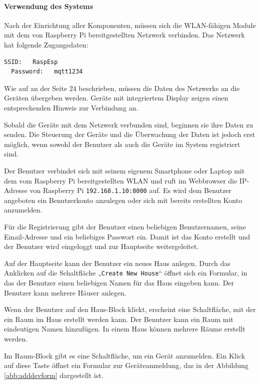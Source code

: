 \documentclass[12pt, letterpaper]{article}
\begin{document}
\paragraph{Verwendung des Systems}
\par \textbf{}
\par Nach der Einrichtung aller Komponenten, müssen sich die WLAN-fähigen Module mit dem von Raspberry Pi bereitgestellten Netzwerk verbinden. Das Netzwerk hat folgende Zugangsdaten:
\begin{Verbatim}[frame=single]
      SSID:   RaspEsp
  Password:   mqtt1234
\end{Verbatim}
\par Wie auf an der Seite 24 beschrieben, müssen die Daten des Netzwerks an die Geräten übergeben werden. Geräte mit integriertem Display zeigen einen entsprechenden Hinweis zur Verbindung an.
\par Sobald die Geräte mit dem Netzwerk verbunden sind, beginnen sie ihre Daten zu senden. Die Steuerung der Geräte und die Überwachung der Daten ist jedoch erst möglich, wenn sowohl der Benutzer als auch die Geräte im System registriert sind.
\par Der Benutzer verbindet sich mit seinem eigenem Smartphone oder Laptop mit dem vom Raspberry Pi bereitgestellten WLAN und ruft im Webbrowser die IP-Adresse von Raspberry Pi \texttt{192.168.1.10:8000} auf. Es wird dem Benutzer angeboten ein Benutzerkonto anzulegen oder sich mit bereits erstellten Konto anzumelden.
\par Für die Registrierung gibt der Benutzer einen beliebigen Benutzernamen, seine Email-Adresse und ein beliebiges Passwort ein. Damit ist das Konto erstellt und der Benutzer wird eingeloggt und zur Hauptseite weitergeleitet.
\par Auf der Hauptseite kann der Benutzer ein neues Haus anlegen. Durch das Anklicken auf die Schaltfläche „\texttt{Create New House}“ öffnet sich ein Formular, in das der Benutzer einen beliebigen Namen für das Haus eingeben kann. Der Benutzer kann mehrere Häuser anlegen.
\par Wenn der Benutzer auf den Haus-Block klickt, erscheint eine Schaltfläche, mit der ein Raum im Haus erstellt werden kann. Der Benutzer kann ein Raum mit eindeutigen Namen hinzufügen. In einem Haus können mehrere Räume erstellt werden.
\par Im Raum-Block gibt es eine Schaltfläche, um ein Gerät anzumelden. Ein Klick auf diese Taste öffnet ein Formular zur Geräteanmeldung, das in der Abbildung \ref{abb:adddevform} dargestellt ist.
\end{document}
